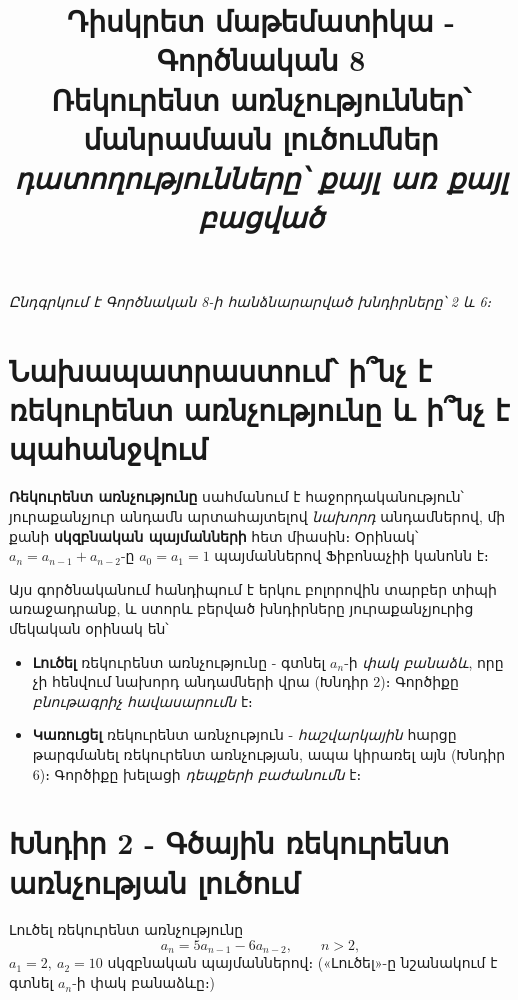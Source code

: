 \documentclass[11pt,a4paper]{article}
\title{\vspace{-1.2cm}\textbf{Դիսկրետ մաթեմատիկա - Գործնական 8}\\[2pt]
\large Ռեկուրենտ առնչություններ՝ մանրամասն լուծումներ\\[2pt]
\normalsize\itshape դատողությունները՝ քայլ առ քայլ բացված}
\author{}
\date{}
\begin{document}
\maketitle
\vspace{-1.0cm}

\begin{center}\small\itshape Ընդգրկում է Գործնական 8-ի հանձնարարված խնդիրները՝ 2 և 6։\end{center}

\section*{Նախապատրաստում՝ ի՞նչ է ռեկուրենտ առնչությունը և ի՞նչ է պահանջվում}

\textbf{Ռեկուրենտ առնչությունը} սահմանում է հաջորդականություն՝ յուրաքանչյուր անդամն
արտահայտելով \emph{նախորդ} անդամներով, մի քանի \textbf{սկզբնական պայմանների} հետ միասին։ Օրինակ՝
$a_{n}=a_{n-1}+a_{n-2}$-ը $a_0=a_1=1$ պայմաններով Ֆիբոնաչիի կանոնն է։

Այս գործնականում հանդիպում է երկու բոլորովին տարբեր տիպի առաջադրանք, և ստորև բերված խնդիրները
յուրաքանչյուրից մեկական օրինակ են՝

\begin{itemize}[leftmargin=1.4em,itemsep=2pt]
  \item \textbf{Լուծել} ռեկուրենտ առնչությունը - գտնել $a_n$-ի \emph{փակ բանաձև}, որը չի հենվում
        նախորդ անդամների վրա (Խնդիր 2)։ Գործիքը \emph{բնութագրիչ հավասարումն} է։
  \item \textbf{Կառուցել} ռեկուրենտ առնչություն - \emph{հաշվարկային} հարցը թարգմանել
        ռեկուրենտ առնչության, ապա կիրառել այն (Խնդիր 6)։ Գործիքը խելացի \emph{դեպքերի բաժանումն} է։
\end{itemize}

\section*{Խնդիր 2 - Գծային ռեկուրենտ առնչության լուծում}

\begin{problembox}[2]
Լուծել ռեկուրենտ առնչությունը
\[
a_n = 5a_{n-1} - 6a_{n-2},\qquad n>2,
\]
$a_1=2,\ a_2=10$ սկզբնական պայմաններով։ («Լուծել»-ը նշանակում է գտնել $a_n$-ի փակ բանաձևը։)
\end{problembox}
\end{document}

